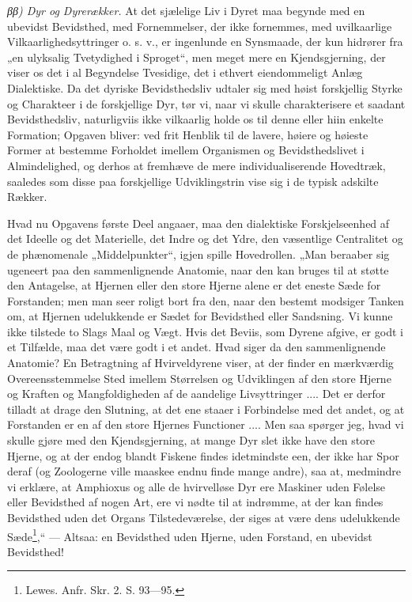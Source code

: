\documentclass[12pt,a4paper]{book}
\begin{document}
\emph{ββ) Dyr og Dyrerækker.} At det sjælelige Liv i Dyret maa begynde
med en ubevidst Bevidsthed, med Fornemmelser, der ikke fornemmes, med
uvilkaarlige Vilkaarlighedsyttringer o. s. v., er ingenlunde en
Synsmaade, der kun hidrører fra „en ulyksalig Tvetydighed i Sproget“, men
meget mere en Kjendsgjerning, der viser os det i al Begyndelse Tvesidige,
det i ethvert eiendommeligt Anlæg Dialektiske. Da det dyriske
Bevidsthedsliv udtaler sig med høist forskjellig Styrke og Charakteer i
de forskjellige Dyr, tør vi, naar vi skulle charakterisere et saadant
Bevidsthedsliv, naturligviis ikke vilkaarlig holde os til denne eller
hiin enkelte Formation; Opgaven bliver: ved frit Henblik til de lavere,
høiere og høieste Former at bestemme Forholdet imellem Organismen og
Bevidsthedslivet i Almindelighed, og derhos at fremhæve de mere
individualiserende Hovedtræk, saaledes som disse paa forskjellige
Udviklingstrin vise sig i de typisk adskilte Rækker.

Hvad nu Opgavens første Deel angaaer, maa den dialektiske
Forskjelseenhed af det Ideelle og det Materielle, det Indre og det Ydre,
den væsentlige Centralitet og de phænomenale „Middelpunkter“, igjen
spille Hovedrollen. „Man beraaber sig ugeneert paa den sammenlignende
Anatomie, naar den kan bruges til at støtte den Antagelse, at Hjernen
eller den store Hjerne alene er det eneste Sæde for Forstanden; men man
seer roligt bort fra den, naar den bestemt modsiger Tanken om, at Hjernen
udelukkende er Sædet for Bevidsthed eller Sandsning. Vi kunne ikke
tilstede to Slags Maal og Vægt.
\setcounter{footnote}{0}
Hvis det Beviis, som Dyrene afgive, er godt i et Tilfælde, maa det være
godt i et andet. Hvad siger da den sammenlignende Anatomie? En
Betragtning af Hvirveldyrene viser, at der finder en mærkværdig
Overeensstemmelse Sted imellem Størrelsen og Udviklingen af den store
Hjerne og Kraften og Mangfoldigheden af de aandelige Livsyttringer ....
Det er derfor tilladt at drage den Slutning, at det ene staaer i
Forbindelse med det andet, og at Forstanden er en af den store Hjernes
Functioner .... Men saa spørger jeg, hvad vi skulle gjøre med den
Kjendsgjerning, at mange Dyr slet ikke have den store Hjerne, og at der
endog blandt Fiskene findes idetmindste een, der ikke har Spor deraf (og
Zoologerne ville maaskee endnu finde mange andre), saa at, medmindre vi
erklære, at Amphioxus og alle de hvirvelløse Dyr ere Maskiner uden
Følelse eller Bevidsthed af nogen Art, ere vi nødte til at indrømme, at
der kan findes Bevidsthed uden det Organs Tilstedeværelse, der siges at
være dens udelukkende Sæde\footnote{Lewes. Anfr. Skr. 2. S. 93---95.},“
--- Altsaa: en Bevidsthed uden Hjerne, uden Forstand, en ubevidst
Bevidsthed!
\end{document}
